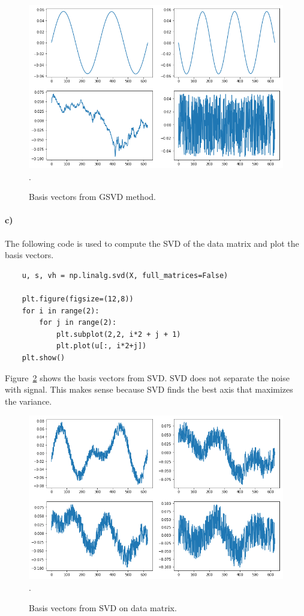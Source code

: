 \documentclass{article}
\begin{document}
\begin{figure}[h!]
\centering
\includegraphics[width=\linewidth]{../images/2aiii.png}.
\caption{Basis vectors from GSVD method.}
\label{fig:basis_vectors_gsvd}
\end{figure}

\paragraph{c)} The following code is used to compute the SVD of the data matrix and plot the basis vectors. 
\begin{lstlisting}
	u, s, vh = np.linalg.svd(X, full_matrices=False)

	plt.figure(figsize=(12,8))
	for i in range(2):
	    for j in range(2):
	        plt.subplot(2,2, i*2 + j + 1)
	        plt.plot(u[:, i*2+j])
	plt.show()
\end{lstlisting}
Figure~\ref{fig:basis_vectors_svd} shows the basis vectors from SVD. SVD does not separate the noise with signal. This makes sense because SVD finds the best axis that maximizes the variance. 
\begin{figure}[h!]
\centering
\includegraphics[width=\linewidth]{../images/2c.png}.
\caption{Basis vectors from SVD on data matrix.}
\label{fig:basis_vectors_svd}
\end{figure}
\end{document}
